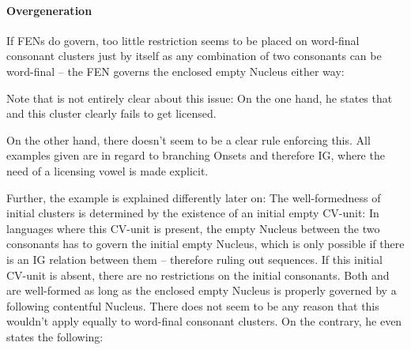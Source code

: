 \paragraph{}


\paragraph{Overgeneration}
If \glspl{FEN} do govern, too little restriction seems to be placed on
word-final consonant clusters just by \CVCV itself as any combination of
two consonants can be word-final -- the \gls{FEN} governs
the enclosed empty Nucleus either way:

\begin{structure}{\ti{*[Sa:kf]}}
  \wordstart
  \emptyV[gov]
  \fen
\end{structure}

Note that \cite{scheer2004} is not entirely clear about this issue:
On the one hand, he states that
and this cluster clearly fails to get licensed.


On the other hand, there doesn't seem to be a clear rule enforcing this.
All examples given are in regard to branching Onsets and therefore \gls{IG},
where the need of a licensing vowel is made explicit.

Further, the  example is explained differently later on:
The well-formedness of initial  clusters is determined by the existence
of an initial empty CV-unit:
In languages where this CV-unit is present, the empty Nucleus between the two consonants
has to govern the initial empty Nucleus, which is only possible if there is
an \gls{IG} relation between them -- therefore ruling out  sequences.
If this initial CV-unit is absent, there are no restrictions on the initial consonants.
Both  and  are well-formed as long as the enclosed empty Nucleus
is properly governed by a following contentful Nucleus.
There does not seem to be any reason that this wouldn't apply equally to word-final
consonant clusters. On the contrary, he even states the following:
